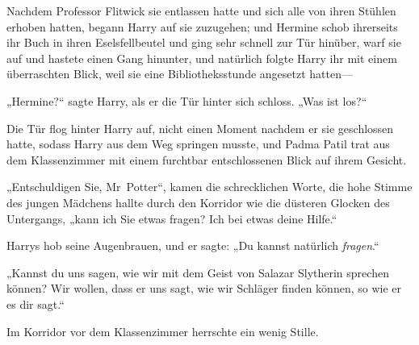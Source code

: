 Nachdem Professor Flitwick sie entlassen hatte und sich alle von ihren Stühlen erhoben hatten, begann Harry auf sie zuzugehen; und Hermine schob ihrerseits ihr Buch in ihren Eselsfellbeutel und ging sehr schnell zur Tür hinüber, warf sie auf und hastete einen Gang hinunter, und natürlich folgte Harry ihr mit einem überraschten Blick, weil sie eine Bibliotheksstunde angesetzt hatten—

„Hermine?“ sagte Harry, als er die Tür hinter sich schloss. „Was ist los?“

Die Tür flog hinter Harry auf, nicht einen Moment nachdem er sie geschlossen hatte, sodass Harry aus dem Weg springen musste, und Padma Patil trat aus dem Klassenzimmer mit einem furchtbar entschlossenen Blick auf ihrem Gesicht.

„Entschuldigen Sie, Mr~Potter“, kamen die schrecklichen Worte, die hohe Stimme des jungen Mädchens hallte durch den Korridor wie die düsteren Glocken des Untergangs, „kann ich Sie etwas fragen? Ich bei etwas deine Hilfe.“

Harrys hob seine Augenbrauen, und er sagte: „Du kannst natürlich \emph{fragen}.“

„Kannst du uns sagen, wie wir mit dem Geist von Salazar Slytherin sprechen können? Wir wollen, dass er uns sagt, wie wir Schläger finden können, so wie er es dir sagt.“

Im Korridor vor dem Klassenzimmer herrschte ein wenig Stille.

